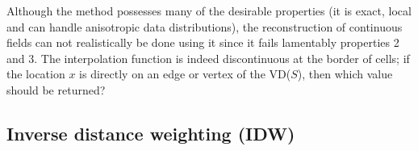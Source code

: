 Although the method possesses many of the desirable properties (it is exact, local and can handle anisotropic data distributions), the reconstruction of continuous fields can not realistically be done using it since it fails lamentably properties 2 and 3. 
The interpolation function is indeed discontinuous at the border of cells; if the location $x$ is directly on an edge or vertex of the VD($S$), then which value should be returned?


\subsection{Inverse distance weighting (IDW)}

